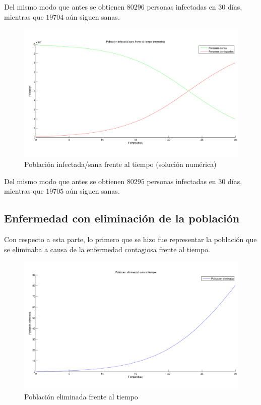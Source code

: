 \documentclass[a4paper,11pt]{article}
\numberwithin{equation}{section}
\begin{document}
\indent Del mismo modo que antes se obtienen $ 80296 $ personas infectadas en 30 días, mientras que $ 19704 $ aún siguen sanas.

\begin{figure}[h!]
	\centering 		
	\includegraphics[width=1\textwidth]{grafica3.pdf}
	\caption{Población infectada/sana frente al tiempo (solución numérica)}
	\label{Fig:3}
\end{figure}

\newpage
\indent Del mismo modo que antes se obtienen $ 80295 $ personas infectadas en 30 días, mientras que $ 19705 $ aún siguen sanas.

\subsection{Enfermedad con eliminación de la población}
\indent Con respecto a esta parte, lo primero que se hizo fue representar la población que se eliminaba a causa de la enfermedad contagiosa frente al tiempo. \\
\begin{figure}[h!]
	\centering 		
	\includegraphics[width=1\textwidth]{grafica4.pdf}
	\caption{Población eliminada frente al tiempo}
	\label{Fig:4}
\end{figure}
\end{document}
